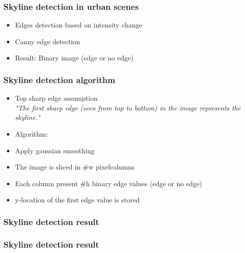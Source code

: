 \documentclass{beamer}
\begin{document}
\frame
{
	\frametitle{Skyline detection in urban scenes}%
	\begin{itemize}
		\item <+-| alert@+> Edges detection based on intensity change
		\item <+-| alert@+> Canny edge detection 
		\item <+-| alert@+> Result: Binary image (edge or no edge)

	\end{itemize}
}


\frame
{
	\frametitle{Skyline detection algorithm}%
	\begin{itemize}
		\item <+-| alert@+> Top sharp edge assumption\\
		\emph{"The first sharp edge (seen from top to bottom) in the image represents the skyline."}
		\item Algorithm:
		\item <+-| alert@+> Apply gaussian smoothing
		\item <+-| alert@+> The image is sliced in \#w pixelcolumns
		\item <+-| alert@+> Each column present \#h binary edge values (edge or no edge)
		\item <+-| alert@+> y-location of the first edge value is stored 
	\end{itemize}
}



\frame
{
	\frametitle{Skyline detection result}%
}

\frame
{
	\frametitle{Skyline detection result}%
}
\end{document}
